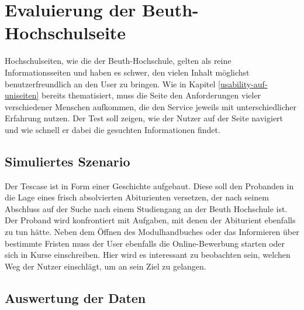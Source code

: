 %
%
%
%

\section{Evaluierung der Beuth-Hochschulseite}

Hochschulseiten, wie die der Beuth-Hochschule, gelten als reine Informationsseiten und haben es schwer, den vielen Inhalt möglichst benutzerfreundlich an den User zu bringen. Wie in Kapitel \ref{usability-auf-uniseiten} bereits thematisiert, muss die Seite den Anforderungen vieler verschiedener Menschen aufkommen, die den Service jeweils mit unterschiedlicher Erfahrung nutzen. Der Test soll zeigen, wie der Nutzer auf der Seite navigiert und wie schnell er dabei die gesuchten Informationen findet.

\subsection{Simuliertes Szenario}

Der Tescase ist in Form einer Geschichte aufgebaut. Diese soll den Probanden in die Lage eines frisch absolvierten Abiturienten versetzen, der nach seinem Abschluss auf der Suche nach einem Studiengang an der Beuth Hochschule ist. Der Proband wird konfrontiert mit Aufgaben, mit denen der Abiturient ebenfalls zu tun hätte. Neben dem Öffnen des Modulhandbuches oder das Informieren über bestimmte Fristen muss der User ebenfalls die Online-Bewerbung starten oder sich in Kurse einschreiben. Hier wird es interessant zu beobachten sein, welchen Weg der Nutzer einschlägt, um an sein Ziel zu gelangen.

\subsection{Auswertung der Daten}

